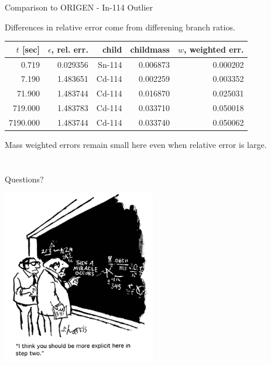 \documentclass[xcolor=x11names,compress]{beamer}
\begin{document}

\begin{frame}{Comparison to ORIGEN - In-114 Outlier}

    Differences in relative error come from differening branch ratios.

    \begin{center}
    \begin{tabular}{rrrrr}
    \hline
 $t$ [sec] & $\epsilon$, rel. err. &      child &  childmass &  $w$, weighted err. \\
\hline
     0.719 &  0.029356 &  Sn-114 &   0.006873 &     0.000202 \\
     7.190 &  1.483651 &  Cd-114 &   0.002259 &     0.003352 \\
    71.900 &  1.483744 &  Cd-114 &   0.016870 &     0.025031 \\
   719.000 &  1.483783 &  Cd-114 &   0.033710 &     0.050018 \\
  7190.000 &  1.483744 &  Cd-114 &   0.033740 &     0.050062 \\
    \hline
    \end{tabular}
    \end{center}

    \vspace*{1em}
    Mass weighted errors remain small here even when relative error is large.

\end{frame}


\section*{}
\begin{frame}[fragile]{Questions?}

    \begin{center}
    \includegraphics[height=3in,clip]{questions-comic.png}
    \end{center}

\end{frame}
\end{document}
